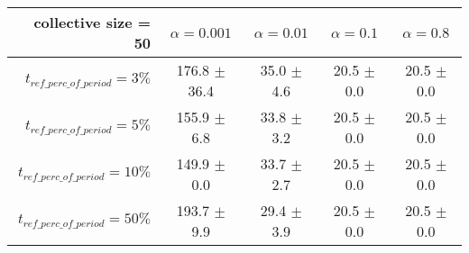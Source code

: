 \begin{table}[t]
	\begin{minipage}{\textwidth}
		\centering
		\begin{tabular}{r | c c c c} \toprule
			collective size = 50
			  & {$\alpha = 0.001$} & {$\alpha = 0.01$} & {$\alpha = 0.1$} & {$\alpha = 0.8$} \\\hline
			{$t_{ref\_perc\_of\_period} = 3\%$} & 176.8 $\pm$ 36.4 & 35.0 $\pm$ 4.6 & 20.5 $\pm$ 0.0 & 20.5 $\pm$ 0.0 \\
			{$t_{ref\_perc\_of\_period} = 5\%$} & 155.9 $\pm$ 6.8 & 33.8 $\pm$ 3.2 & 20.5 $\pm$ 0.0 & 20.5 $\pm$ 0.0 \\
			{$t_{ref\_perc\_of\_period} = 10\%$} & 149.9 $\pm$ 0.0 & 33.7 $\pm$ 2.7 & 20.5 $\pm$ 0.0 & 20.5 $\pm$ 0.0 \\
			{$t_{ref\_perc\_of\_period} = 50\%$} & 193.7 $\pm$ 9.9 & 29.4 $\pm$ 3.9 & 20.5 $\pm$ 0.0 & 20.5 $\pm$ 0.0
		\end{tabular}
	\end{minipage}
\caption*{}
\end{table}